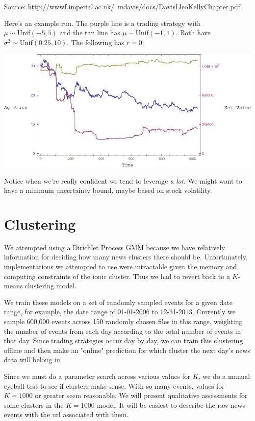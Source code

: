 \documentclass{article}
\begin{document}
Source: http://wwwf.imperial.ac.uk/~mdavis/docs/DavisLleoKellyChapter.pdf

Here's an example run. The purple line is a trading strategy with $\mu\sim\text{Unif}(-5,5)$ and the tan line has $\mu\sim\text{Unif}(-1,1)$. Both have $\sigma^2\sim\text{Unif}(0.25,10)$. The following has $r=0$:

\begin{center}
\includegraphics[scale=0.5]{../KellyRun-Random.png}
\end{center}

Notice when we're really confident we tend to leverage {\em a lot}. We might want to have a minimum uncertainty bound, maybe based on stock volatility.

		\section{Clustering}
	
	We attempted using a Dirichlet Process GMM because we have relatively information for deciding how many news clusters there should be. Unfortunately, implementations we attempted to use were intractable given the memory and computing constraints of the ionic cluster. Thus we had to revert back to a $K$-means clustering model.

	We train these models on a set of randomly sampled events for a given date range, for example, the date range of 01-01-2006 to 12-31-2013. Currently we sample 600,000 events across 150 randomly chosen files in this range, weighting the number of events from each day according to the total number of events in that day. Since trading strategies occur day by day, we can train this clustering offline and then make an "online" prediction for which cluster the next day's news data will belong in.

	Since we must do a parameter search across various values for $K$, we do a manual eyeball test to see if clusters make sense. With so many events, values for $K=1000$ or greater seem reasonable. We will present qualitative assessments for some clusters in the $K=1000$ model. It will be easiest to describe the raw news events with the url associated with them.
\end{document}

